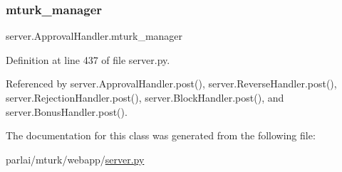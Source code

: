 \subsubsection{\texorpdfstring{mturk\+\_\+manager}{mturk\_manager}}
{\footnotesize\ttfamily server.\+Approval\+Handler.\+mturk\+\_\+manager}



Definition at line 437 of file server.\+py.



Referenced by server.\+Approval\+Handler.\+post(), server.\+Reverse\+Handler.\+post(), server.\+Rejection\+Handler.\+post(), server.\+Block\+Handler.\+post(), and server.\+Bonus\+Handler.\+post().



The documentation for this class was generated from the following file\+:\begin{DoxyCompactItemize}
\item 
parlai/mturk/webapp/\hyperlink{server_8py}{server.\+py}\end{DoxyCompactItemize}
